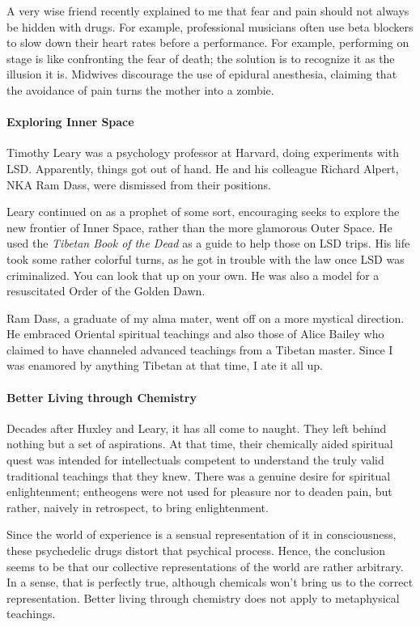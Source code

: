 A very wise friend recently explained to me that fear and pain should not always be hidden with drugs. For example, professional musicians often use beta blockers to slow down their heart rates before a performance. For example, performing on stage is like confronting the fear of death; the solution is to recognize it as the illusion it is. Midwives discourage the use of epidural anesthesia, claiming that the avoidance of pain turns the mother into a zombie.

\paragraph{Exploring Inner Space}
Timothy Leary was a psychology professor at Harvard, doing experiments with LSD. Apparently, things got out of hand. He and his colleague Richard Alpert, NKA Ram Dass, were dismissed from their positions.

Leary continued on as a prophet of some sort, encouraging seeks to explore the new frontier of Inner Space, rather than the more glamorous Outer Space. He used the \emph{Tibetan Book of the Dead} as a guide to help those on LSD trips. His life took some rather colorful turns, as he got in trouble with the law once LSD was criminalized. You can look that up on your own. He was also a model for a resuscitated Order of the Golden Dawn.

Ram Dass, a graduate of my alma mater, went off on a more mystical direction. He embraced Oriental spiritual teachings and also those of Alice Bailey who claimed to have channeled advanced teachings from a Tibetan master. Since I was enamored by anything Tibetan at that time, I ate it all up.

\paragraph{Better Living through Chemistry}
Decades after Huxley and Leary, it has all come to naught. They left behind nothing but a set of aspirations. At that time, their chemically aided spiritual quest was intended for intellectuals competent to understand the truly valid traditional teachings that they knew. There was a genuine desire for spiritual enlightenment; entheogens were not used for pleasure nor to deaden pain, but rather, naively in retrospect, to bring enlightenment.

Since the world of experience is a sensual representation of it in consciousness, these psychedelic drugs distort that psychical process. Hence, the conclusion seems to be that our collective representations of the world are rather arbitrary. In a sense, that is perfectly true, although chemicals won't bring us to the correct representation. Better living through chemistry does not apply to metaphysical teachings.

